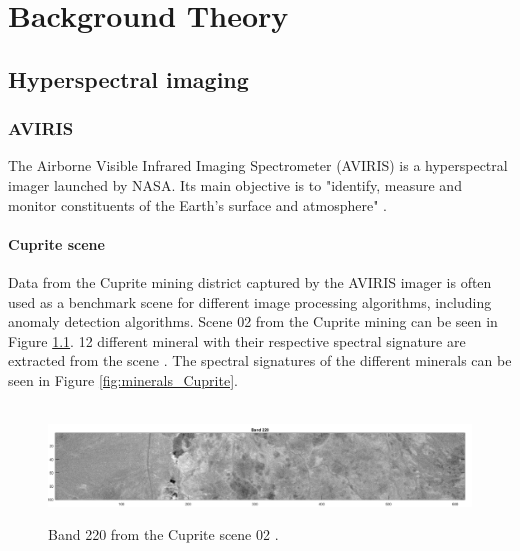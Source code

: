 \newpage
\chapter{Background Theory}
\label{sec:theory}

\section{Hyperspectral imaging}
\subsection{AVIRIS}
The Airborne Visible Infrared Imaging Spectrometer (AVIRIS) is a hyperspectral imager launched by NASA. Its main objective is to "identify, measure and monitor constituents of the Earth's surface and atmosphere" \cite{aviris}. 
\subsubsection{Cuprite scene}
Data from the Cuprite mining district \cite{Cuprite_data} captured by the AVIRIS imager is often used as a benchmark scene for different image processing algorithms, including anomaly detection algorithms. Scene 02 from the Cuprite mining can be seen in Figure \ref{fig:cuprite_mining_scene}. 12 different mineral with their respective spectral signature are extracted from the scene \cite{aviris_minerals}. The spectral signatures of the different minerals can be seen in Figure \ref{fig:minerals_Cuprite}. 

\begin{figure}[H]
\hbox{\hspace*{-1cm}                                              
   \includegraphics[scale=0.55]{images/AD_testing/original_band_220_22_1.png}}
  \caption{ Band 220 from the Cuprite scene 02 \cite{Cuprite_data}. } 
  \label{fig:cuprite_mining_scene}
\end{figure}

